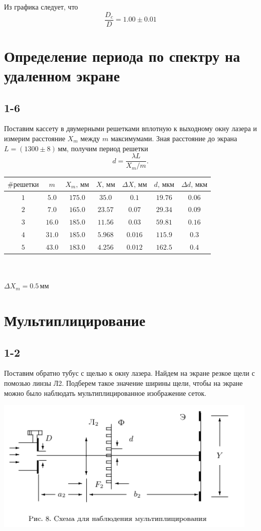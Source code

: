 Из графика следует, что
\[\frac{D_c}{D} = 1.00\pm0.01\]


\section*{Определение периода по спектру на удаленном экране}
\subsection*{1-6}
Поставим кассету в двумерными решетками вплотную к выходному окну лазера и измерим расстояние $X_m$ между $m$ максимумами. Зная расстояние до экрана $L = (1300\pm8)\,\text{мм}$, получим период решетки
\[d = \frac{\lambda L}{X_m / m}.\]

\begin{center}
\begin{tabular}{|c|c|c|c|c|c|c|}\hline
$\text{\#решетки}$&$m$&$X_m\text{, мм}$&$X\text{, мм}$&$\Delta X\text{, мм}$&$d\text{, мкм}$&$\Delta d\text{, мкм}$\\\hline
$1$&$5.0$&$175.0$&$35.0$&$0.1$&$19.76$&$0.06$\\\hline
$2$&$7.0$&$165.0$&$23.57$&$0.07$&$29.34$&$0.09$\\\hline
$3$&$16.0$&$185.0$&$11.56$&$0.03$&$59.81$&$0.16$\\\hline
$4$&$31.0$&$185.0$&$5.968$&$0.016$&$115.9$&$0.3$\\\hline
$5$&$43.0$&$183.0$&$4.256$&$0.012$&$162.5$&$0.4$\\\hline
\end{tabular}\\~\\
$\Delta X_m=0.5\,\text{мм}$
\end{center}

\section*{Мультиплицирование}
\subsection*{1-2}
Поставим обратно тубус с щелью к окну лазера. Найдем на экране резкое щели с помозью линзы Л2. Подберем такое значение ширины щели, чтобы на экране можно было наблюдать мультиплицированное изображение сеток.

\begin{center}
\includegraphics[width=0.95\textwidth]{3.png}
\end{center}

